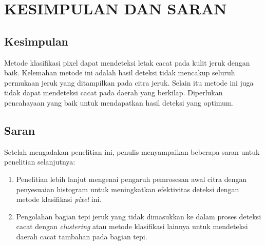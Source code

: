 \documentclass[laporan.tex]{subfiles}
\begin{document}
\chapter{KESIMPULAN DAN SARAN}

\section{Kesimpulan}

Metode klasifikasi pixel dapat mendeteksi letak cacat pada kulit jeruk dengan baik. Kelemahan metode ini adalah hasil deteksi tidak mencakup seluruh permukaan jeruk yang ditampilkan pada citra jeruk. Selain itu metode ini juga tidak dapat mendeteksi cacat pada daerah yang berkilap. Diperlukan pencahayaan yang baik untuk mendapatkan hasil deteksi yang optimum.

\section{Saran}

Setelah mengadakan penelitian ini, penulis menyampaikan beberapa saran untuk penelitian selanjutnya:

\begin{enumerate}
\item Penelitian lebih lanjut mengenai pengaruh pemrosesan awal citra dengan penyesuaian histogram untuk meningkatkan efektivitas deteksi dengan metode klasifikasi \emph{pixel} ini.
\item Pengolahan bagian tepi jeruk yang tidak dimasukkan ke dalam proses deteksi cacat dengan \emph{clustering} atau metode klasifikasi lainnya untuk mendeteksi daerah cacat tambahan pada bagian tepi.
\end{enumerate}
\end{document}
